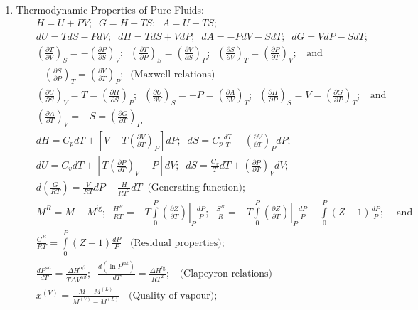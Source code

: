 \documentclass[12pts,a4paper,amsmath,amssymb,floatfix]{article}%
\newcommand{\frc}{\displaystyle\frac}
\newcommand{\Partial}[3][error]{\left(\frc{\partial #1}{\partial #2}\right)_{#3}}
\newcommand{\mfr}[3][error]{#1_{#2}^{\left(#3\right)}}
\begin{document}
\begin{enumerate}[1.]
\item Thermodynamic Properties of Pure Fluids:
  \begin{eqnarray}
    && H = U + P V;\;\; G = H - T S;\;\; A = U - T S; \nonumber \\
    && dU = T dS - PdV;\;\; dH = TdS + VdP;\;\; dA = -PdV - SdT;\;\;dG = VdP - SdT; \nonumber \\
    && \Partial[T]{V}{S}=-\Partial[P]{S}{V};\;\;\Partial[T]{P}{S}=\Partial[V]{S}{P};\;\; \Partial[S]{V}{T}=\Partial[P]{T}{V};\;\;\text{ and } \nonumber \\
    && -\Partial[S]{P}{T}=\Partial[V]{T}{P};\;\;\text{(Maxwell relations)} \nonumber \\
    && \Partial[U]{S}{V}=T=\Partial[H]{S}{P};\;\; \Partial[U]{V}{S}=-P=\Partial[A]{V}{T};\;\; \Partial[H]{P}{S} = V = \Partial[G]{P}{T};\;\;\text{ and }\nonumber \\
    && \Partial[A]{T}{V} = -S = \Partial[G]{T}{P} \nonumber \\
    && dH = C_{p}dT + \left[V - T\Partial[V]{T}{P}\right]dP;\;\; dS = C_{p}\frc{dT}{T} - \Partial[V]{T}{P}dP; \nonumber \\
    && dU = C_{v}dT + \left[T\Partial[P]{T}{V}-P\right]dV;\;\; dS = \frc{C_{v}}{T}dT + \Partial[P]{T}{V}dV; \nonumber \\
    && d\left(\frc{G}{RT}\right) = \frc{V}{RT}dP - \frc{H}{RT^{2}}dT\;\;\text{(Generating function)}; \nonumber \\
    && M^{R} = M - M^{\text{ig}};\;\;\frc{H^{R}}{RT} = - T\int\limits_{0}^{P}\left.\Partial[Z]{T}{}\right|_{P}\frc{dP}{P}; \;\; \frc{S^{R}}{R} = -T\int\limits_{0}^{P}\left.\Partial[Z]{T}{}\right|_{P}\frc{dP}{P} - \int\limits_{0}^{P}\left(Z-1\right)\frc{dP}{P};\;\;\;\text{ and } \nonumber \\
    &&  \frc{G^{R}}{RT} =  \int\limits_{0}^{P}\left(Z-1\right)\frc{dP}{P}\;\;\text{ (Residual properties)}; \nonumber \\
    && \frc{dP^{\text{sat}}}{dT} = \frc{\Delta H^{\alpha\beta}}{T\Delta V^{\alpha\beta}};\;\; \frc{d\left(\ln{P^{\text{sat}}}\right)}{dT} = \frc{\Delta H^{\text{fg}}}{RT^{2}};\;\;\text{ (Clapeyron relations)} \nonumber \\
    && \mfr[x]{}{V} = \frc{M-\mfr[M]{}{L}}{\mfr[M]{}{V}-\mfr[M]{}{L}}\;\;\text{ (Quality of vapour)}; \nonumber
  \end{eqnarray}
  


\end{enumerate}
\end{document}
